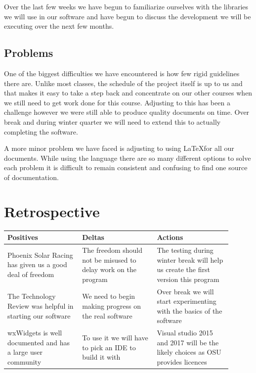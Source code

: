 \begin{singlespace}
Over the last few weeks we have begun to familiarize ourselves with the libraries we will use in our software and have begun to discuss the development we will be executing over the next few months. 
\subsection{Problems}
One of the biggest difficulties we have encountered is how few rigid guidelines there are. Unlike most classes, the schedule of the project itself is up to us and that makes it easy to take a step back and concentrate on our other courses when we still need to get work done for this course. Adjusting to this has been a challenge however we were still able to produce quality documents on time. Over break and during winter quarter we will need to extend this to actually completing the software.

A more minor problem we have faced is adjusting to using \LaTeX for all our documents. While using the language there are so many different options to solve each problem it is difficult to remain consistent and confusing to find one source of documentation. 

\section{Retrospective}


\vspace{1cm}
\begin{center}
\begin{tabular}{|p{0.3\linewidth}|p{0.3\linewidth}|p{0.3\linewidth}|} 
\hline
Positives   & Deltas   & Actions   \\
\hline
Phoenix Solar Racing has given us a good deal of freedom & The freedom should not be misused to delay work on the program & The testing during winter break will help us create the first version this program \\
The Technology Review was helpful in starting our software & We need to begin making progress on the real software & Over break we will start experimenting with the basics of the software \\
wxWidgets is well documented and has a large user community \cite{wx}& To use it we will have to pick an IDE to build it with & Visual studio 2015 and 2017 will be the likely choices as OSU provides licences \\
\hline
\end{tabular}
\end{center}


\end{singlespace}
